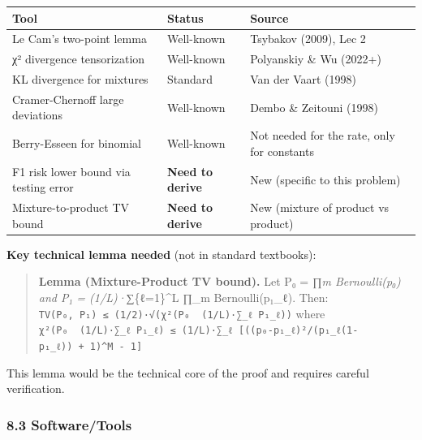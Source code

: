 \documentclass[
  12pt,
]{ctexart}
\begin{document}
\begin{longtable}[]{@{}
  >{\raggedright\arraybackslash}p{}
  >{\raggedright\arraybackslash}p{}
  >{\raggedright\arraybackslash}p{}@{}}
\toprule\noalign{}
\begin{minipage}[b]{\linewidth}\raggedright
Tool
\end{minipage} & \begin{minipage}[b]{\linewidth}\raggedright
Status
\end{minipage} & \begin{minipage}[b]{\linewidth}\raggedright
Source
\end{minipage} \\
\midrule\noalign{}
\endhead
\bottomrule\noalign{}
\endlastfoot
Le Cam's two-point lemma & Well-known & Tsybakov (2009), Lec 2 \\
χ² divergence tensorization & Well-known & Polyanskiy \& Wu (2022+) \\
KL divergence for mixtures & Standard & Van der Vaart (1998) \\
Cramer-Chernoff large deviations & Well-known & Dembo \& Zeitouni
(1998) \\
Berry-Esseen for binomial & Well-known & Not needed for the rate, only
for constants \\
F1 risk lower bound via testing error & \textbf{Need to derive} & New
(specific to this problem) \\
Mixture-to-product TV bound & \textbf{Need to derive} & New (mixture of
product vs product) \\
\end{longtable}

\textbf{Key technical lemma needed} (not in standard textbooks):

\begin{quote}
\textbf{Lemma (Mixture-Product TV bound).} Let P₀ = ∏\emph{m
Bernoulli(p₀) and P₁ = (1/L)·∑}\{ℓ=1\}\^{}L ∏\_m Bernoulli(p₁\_ℓ). Then:
\texttt{TV(P₀,\ P₁)\ ≤\ (1/2)·√(χ²(P₀\ \textbar{}\textbar{}\ (1/L)·∑\_ℓ\ P₁\_ℓ))}
where
\texttt{χ²(P₀\ \textbar{}\textbar{}\ (1/L)·∑\_ℓ\ P₁\_ℓ)\ ≤\ (1/L)·∑\_ℓ\ {[}((p₀-p₁\_ℓ)²/(p₁\_ℓ(1-p₁\_ℓ))\ +\ 1)\^{}M\ -\ 1{]}}
\end{quote}

This lemma would be the technical core of the proof and requires careful
verification.

\subsubsection{8.3 Software/Tools}\label{softwaretools}
\end{document}

